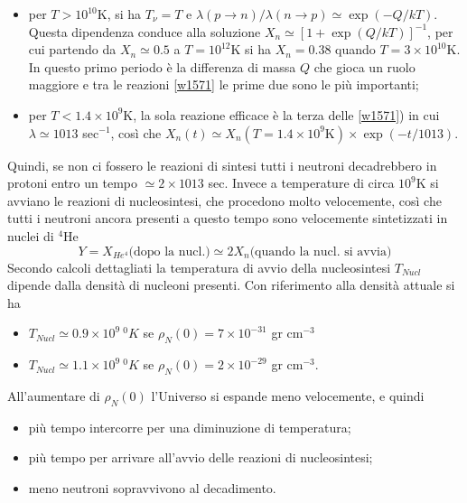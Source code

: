 \begin{itemize}
\item per $T>10^{10}$K, si ha $T_{\nu}=T$ e $\lambda(p\to n)/\lambda(n\to p)
  \simeq \exp(-Q/kT)$.  Questa dipendenza conduce alla soluzione $X_n \simeq
  [1+\exp (Q/kT)]^{-1}$, per cui partendo da $X_n \simeq 0.5$ a $T= 10^{12}$K si
  ha $X_n=0.38$ quando $T= 3 \times 10^{10}$K.  In questo primo periodo è la
  differenza di massa $Q$ che gioca un ruolo maggiore e tra le reazioni
  \eqref{w1571} le prime due sono le più importanti;
\item per $T<1.4 \times 10^{9}$K, la sola reazione efficace è la terza delle
  \eqref{w1571}) in cui $\lambda \simeq 1013$ sec$^{-1}$, così che
  $X_n(t) \simeq X_n(T=1.4 \times 10^{9}\text{K}) \times  \exp(-t/1013)$. \\
\end{itemize}
Quindi, se non ci fossero le reazioni di sintesi tutti i neutroni decadrebbero
in protoni entro un tempo $\simeq 2 \times 1013$ sec.  Invece a temperature di
circa $10^9$K si avviano le reazioni di nucleosintesi, che procedono molto
velocemente, così che tutti i neutroni ancora presenti a questo tempo sono
velocemente sintetizzati in nuclei di $^4$He
\begin{equation}
  Y = X_{He^4} \text{(dopo la nucl.)} \simeq 2X_n \text{(quando la nucl. si
    avvia)}
\end{equation}
Secondo calcoli dettagliati la temperatura di avvio della nucleosintesi
$T_{Nucl}$ dipende dalla densità di nucleoni presenti.  Con riferimento alla
densità attuale si ha
\begin{itemize}
\item $T_{Nucl} \simeq 0.9 \times 10^9~^0K$ se $\rho_N(0) = 7 \times 10^{-31}$
  gr cm$^{-3}$
\item $T_{Nucl} \simeq 1.1 \times 10^9~^0K$ se $\rho_N(0) = 2 \times 10^{-29}$
  gr cm$^{-3}$.
\end{itemize}
All'aumentare di $\rho_N(0)$ l'Universo si espande meno velocemente, e quindi
\begin{itemize}
\item più tempo intercorre per una diminuzione di temperatura;
\item più tempo per arrivare all'avvio delle reazioni di nucleosintesi;
\item meno neutroni sopravvivono al decadimento.
\end{itemize}

